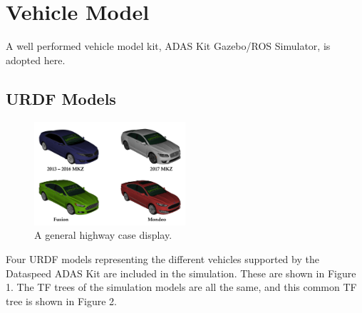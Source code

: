 \section{Vehicle Model}

A well performed vehicle model kit, ADAS Kit Gazebo/ROS Simulator, is adopted here.

\subsection{URDF Models}

\begin{figure}[h]
\centering
\includegraphics[width=0.5\textwidth]{figs/ch2/mkz-cover}
\caption{A general highway case display.}
\end{figure}

Four URDF models representing the different vehicles supported by the Dataspeed ADAS Kit are included in the simulation. These are shown in Figure 1. The TF trees of the simulation models are all the same, and this common TF tree is shown in Figure 2.

